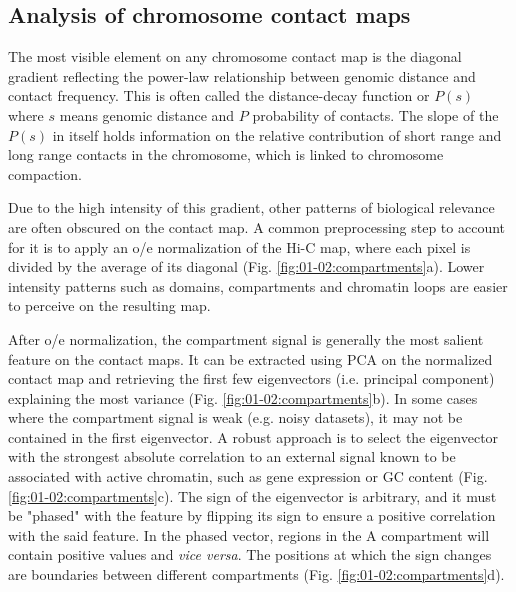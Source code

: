 \subsection{Analysis of chromosome contact maps}

The most visible element on any chromosome contact map is the diagonal gradient reflecting the power-law relationship between genomic distance and contact frequency. This is often called the distance-decay function or $P(s)$ where $s$ means genomic distance and $P$ probability of contacts. The slope of the $P(s)$ in itself holds information on the relative contribution of short range and long range contacts in the chromosome, which is linked to chromosome compaction.

Due to the high intensity of this gradient, other patterns of biological relevance are often obscured on the contact map. A common preprocessing step to account for it is to apply an \acrfull{o/e} normalization of the Hi-C map, where each pixel is divided by the average of its diagonal (Fig. \ref{fig:01-02:compartments}a). Lower intensity patterns such as domains, compartments and chromatin loops are easier to perceive on the resulting map.

After \acrshort{o/e} normalization, the compartment signal is generally the most salient feature on the contact maps. It can be extracted using \acrfull{PCA} on the normalized contact map \cite{lajoieHitchhikerGuideHiC2015} and retrieving the first few eigenvectors (i.e. principal component) explaining the most variance (Fig. \ref{fig:01-02:compartments}b). In some cases where the compartment signal is weak (e.g. noisy datasets), it may not be contained in the first eigenvector. A robust approach is to select the eigenvector with the strongest absolute correlation to an external signal known to be associated with active chromatin, such as gene expression or GC content \cite{sergeyvenevOpen2cCooltoolsV02021} (Fig. \ref{fig:01-02:compartments}c). The sign of the eigenvector is arbitrary, and it must be "phased" with the feature by flipping its sign to ensure a positive correlation with the said feature. In the phased vector, regions in the A compartment will contain positive values and \textit{vice versa}. The positions at which the sign changes are boundaries between different compartments (Fig. \ref{fig:01-02:compartments}d).

